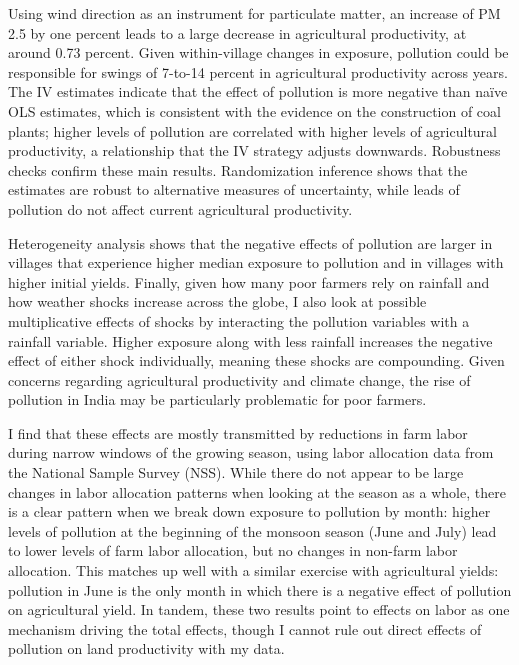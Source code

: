 \documentclass[
]{article}
\begin{document}
Using wind direction as an instrument for particulate matter, an increase of PM 2.5 by one percent leads to a large decrease in agricultural productivity, at around 0.73 percent. Given within-village changes in exposure, pollution could be responsible for swings of 7-to-14 percent in agricultural productivity across years. The IV estimates indicate that the effect of pollution is more negative than naïve OLS estimates, which is consistent with the evidence on the construction of coal plants; higher levels of pollution are correlated with higher levels of agricultural productivity, a relationship that the IV strategy adjusts downwards. Robustness checks confirm these main results. Randomization inference shows that the estimates are robust to alternative measures of uncertainty, while leads of pollution do not affect current agricultural productivity.

Heterogeneity analysis shows that the negative effects of pollution are larger in villages that experience higher median exposure to pollution and in villages with higher initial yields. Finally, given how many poor farmers rely on rainfall and how weather shocks increase across the globe, I also look at possible multiplicative effects of shocks by interacting the pollution variables with a rainfall variable. Higher exposure along with less rainfall increases the negative effect of either shock individually, meaning these shocks are compounding. Given concerns regarding agricultural productivity and climate change, the rise of pollution in India may be particularly problematic for poor farmers.

I find that these effects are mostly transmitted by reductions in farm labor during narrow windows of the growing season, using labor allocation data from the National Sample Survey (NSS). While there do not appear to be large changes in labor allocation patterns when looking at the season as a whole, there is a clear pattern when we break down exposure to pollution by month: higher levels of pollution at the beginning of the monsoon season (June and July) lead to lower levels of farm labor allocation, but no changes in non-farm labor allocation. This matches up well with a similar exercise with agricultural yields: pollution in June is the only month in which there is a negative effect of pollution on agricultural yield. In tandem, these two results point to effects on labor as one mechanism driving the total effects, though I cannot rule out direct effects of pollution on land productivity with my data.
\end{document}
